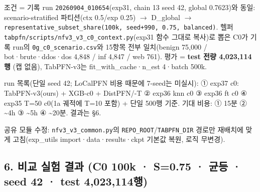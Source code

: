 \par\noindent \textbullet\enspace 조건 =\allowbreak{} 기록 run \texttt{20260904\allowbreak{}\_\allowbreak{}\allowbreak{}010654}(exp31, chain 13 seed 42, global 0.7623)와 동일: scenario-stratified 파티션(ctx 0.5/\allowbreak{}exp 0.25)  \ensuremath{\rightarrow}  D\_\allowbreak{}global  \ensuremath{\rightarrow}  \texttt{represen\allowbreak{}tative\_\allowbreak{}\allowbreak{}s\allowbreak{}ubset\_\allowbreak{}\allowbreak{}sh\allowbreak{}are(100k\allowbreak{},\allowbreak{} seed+\allowbreak{}\allowbreak{}9\allowbreak{}90,\allowbreak{} 0.\allowbreak{}75\allowbreak{},\allowbreak{} balanc\allowbreak{}ed)}. 헬퍼 \texttt{tabpfn/\allowbreak{}\allowbreak{}s\allowbreak{}cripts/\allowbreak{}\allowbreak{}n\allowbreak{}fv3\_\allowbreak{}\allowbreak{}v3\_\allowbreak{}\allowbreak{}c\allowbreak{}0\_\allowbreak{}\allowbreak{}contex\allowbreak{}t.\allowbreak{}py}(exp31 함수 그대로 복사)로 뽑은 C0가 기록 run의 \texttt{0g\_\allowbreak{}\allowbreak{}c0\_\allowbreak{}\allowbreak{}sc\allowbreak{}enario.\allowbreak{}c\allowbreak{}sv}와 15항목 전부 일치(benign 75,000 /\allowbreak{} bot·brute·ddos·dos 4,848 /\allowbreak{} inf 4,847 /\allowbreak{} web 761). 평가 =\allowbreak{} \textbf{test 전량 4,023,114행} (캡 없음), TabPFN-v3는 fit\_\allowbreak{}with\_\allowbreak{}cache·n\_\allowbreak{}est 4·batch 500k.


\par\noindent \textbullet\enspace run 목록(단일 seed 42; LoCalPFN 비용 때문에 7-seed는 미실시): ① exp37 c0: TabPFN-v3(ours) +\allowbreak{} XGB-c0 +\allowbreak{} DistPFN/\allowbreak{}-T ② exp36 knn c0 ③ exp36 ft c0 ④ exp35 T=\allowbreak{}50 c0(1a 궤적에 T=\allowbreak{}10 포함) +\allowbreak{} 단일 500행 기준. 기대 비용: ① 15분 ② \textasciitilde{}4h ③ \textasciitilde{}5h ④ \textasciitilde{}20분. 결과는 §6.


\par\noindent \textbullet\enspace 공유 모듈 수정: \texttt{nfv3\_\allowbreak{}\allowbreak{}v3\_\allowbreak{}\allowbreak{}common.\allowbreak{}p\allowbreak{}y}의 \texttt{REPO\_\allowbreak{}\allowbreak{}ROO\allowbreak{}T}/\allowbreak{}\texttt{TABPFN\_\allowbreak{}\allowbreak{}D\allowbreak{}IR} 경로만 재배치에 맞게 고침(exp\_\allowbreak{}utils import·data·results·ckpt 기본값 복원, 로직 무변경).


\subsection{6. 비교 실험 결과 (C0 100k · S=\allowbreak{}0.75 · 균등 · seed 42 · test 4,023,114행)}
